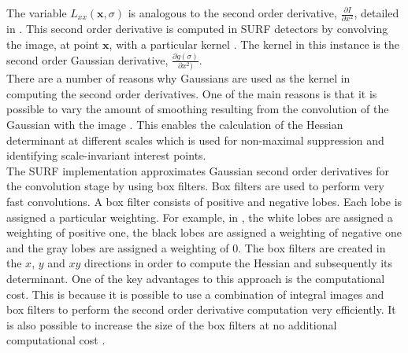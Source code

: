 \documentclass[11pt]{report}
\begin{document}
The variable $L_{xx}(\textbf{x}, \sigma)$ is analogous to the second order derivative, $ \frac{\partial I}{\partial x^2}$, detailed in . This second order derivative is computed in SURF detectors by convolving the image, at point $\textbf{x}$, with a particular kernel \cite{Evans2009}. The kernel in this instance is the second order Gaussian derivative, $\frac{\partial g(\sigma)}{\partial x^2)}$. \\

There are a number of reasons why Gaussians are used as the kernel in computing the second order derivatives. One of the main reasons is that it is possible to vary the amount of smoothing resulting from the convolution of the Gaussian with the image \cite{Evans2009}. This enables the calculation of the Hessian determinant at different scales which is used for non-maximal suppression and identifying scale-invariant interest points.\\

The SURF implementation approximates Gaussian second order derivatives for the convolution stage by using box filters. Box filters are used to perform very fast convolutions. A box filter consists of positive and negative lobes. Each lobe is assigned a particular weighting. For example, in  \cite{Bay2008}, the white lobes are assigned a weighting of positive one, the black lobes are assigned a weighting of negative one and the gray lobes are assigned a weighting of 0. The box filters are created in the $x$, $y$ and $xy$ directions in order to compute the Hessian and subsequently its determinant. One of the key advantages to this approach is the computational cost. This is because it is possible to use a combination of integral images and box filters to perform the second order derivative computation very efficiently. It is also possible to increase the size of the box filters at no additional computational cost \cite{Bay2008}.\\
\end{document}

